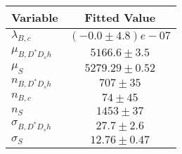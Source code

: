 \begin{tabular}[t]{lc}
\hline
Variable &Fitted Value\\
\hline\hline
$\lambda_{B,c}$&$(-0.0\pm4.8)e-07$\\
\hline
$\mu_{B, D^* D_s h}$&$5166.6\pm3.5$\\
\hline
$\mu_S$&$5279.29\pm0.52$\\
\hline
$n_{B, D^* D_s h}$&$707\pm35$\\
\hline
$n_{B,c}$&$74\pm45$\\
\hline
$n_S$&$1453\pm37$\\
\hline
$\sigma_{B, D^* D_s h}$&$27.7\pm2.6$\\
\hline
$\sigma_S$&$12.76\pm0.47$\\
\hline
\end{tabular}
